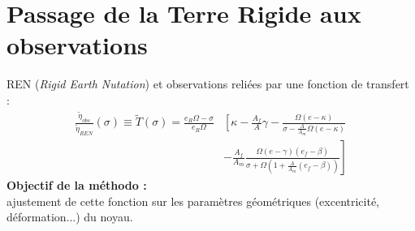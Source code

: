 \section{Passage de la Terre Rigide aux observations}

\begin{frame}
   REN (\textit{Rigid Earth Nutation}) et observations reliées par une fonction de transfert :
   \begin{align*}
     \frac{\tilde{\eta}_{obs}}{\tilde{\eta}_{REN}}(\sigma) 
     \equiv
     \tilde{T}(\sigma) 
     = \frac{e_R\Omega-\sigma}{e_R\Omega} &\left[ \kappa - \frac{A_f}{A}\gamma\right.- \frac{\Omega(e-\kappa)}{\sigma-\frac{A}{A_m}\Omega(e-\kappa)}\\
     &-\left. \frac{A_f}{A_m} \frac{\Omega (e-\gamma)(e_f-\beta)}{\sigma + \Omega(1+ \frac{A}{A_m}(e_f-\beta))}\right]
   \end{align*}
   	 \textbf{Objectif de la méthodo :}
   	\\ajustement de cette fonction sur les paramètres géométriques (excentricité, déformation...) du noyau. 
\end{frame}
